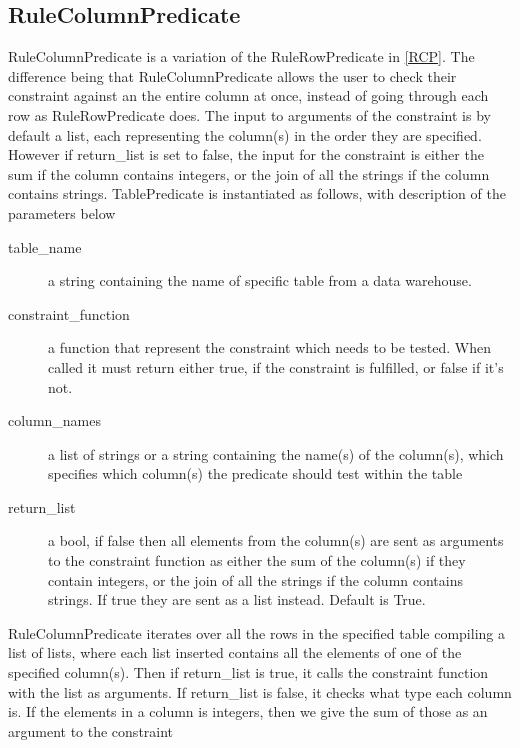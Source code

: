 \subsection{RuleColumnPredicate}
RuleColumnPredicate is a variation of the RuleRowPredicate in \cref{RCP}. The difference being that RuleColumnPredicate allows the user to check their constraint against an the entire column at once, instead of going through each row as RuleRowPredicate does. The input to arguments of the constraint is by default a list, each representing the column(s) in the order they are specified. However if return\_list is set to false, the input for the constraint is either the sum if the column contains integers, or the join of all the strings if the column contains strings. TablePredicate is instantiated as follows, with description of the parameters below


\begin{description}
\item [table\_name] a string containing the name of specific table from a data warehouse. 
\item [constraint\_function] a function that represent the constraint which needs to be tested. When called it must return either true, if the constraint is fulfilled, or false if it's not.
\item [column\_names] a list of strings or a string containing the name(s) of the column(s), which specifies which column(s) the predicate should test within the table
\item [return\_list] a bool, if false then all elements from the column(s) are sent as arguments to the constraint function as either the sum of the column(s) if they contain integers, or the join of all the strings if the column contains strings. If true they are sent as a list instead. Default is True.
\end{description}

RuleColumnPredicate iterates over all the rows in the specified table compiling a list of lists, where each list inserted contains all the elements of one of the specified column(s). Then if return\_list is true, it calls the constraint function with the list as arguments. If return\_list is false, it checks what type each column is. If the elements in a column is integers, then we give the sum of those as an argument to the constraint
